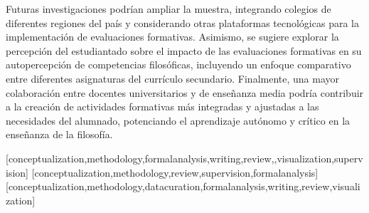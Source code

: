 \documentclass[spanish]{textolivre}
\begin{document}
Futuras investigaciones podrían ampliar la muestra, integrando colegios de diferentes regiones del país y considerando otras plataformas tecnológicas para la implementación de evaluaciones formativas. Asimismo, se sugiere explorar la percepción del estudiantado sobre el impacto de las evaluaciones formativas en su autopercepción de competencias filosóficas, incluyendo un enfoque comparativo entre diferentes asignaturas del currículo secundario. Finalmente, una mayor colaboración entre docentes universitarios y de enseñanza media podría contribuir a la creación de actividades formativas más integradas y ajustadas a las necesidades del alumnado, potenciando el aprendizaje autónomo y crítico en la enseñanza de la filosofía.


\printbibliography\label{sec-bib}


\begin{contributors}
[conceptualization,methodology,formalanalysis,writing,review,,visualization,supervision]
[conceptualization,methodology,review,supervision,formalanalysis]
[conceptualization,methodology,datacuration,formalanalysis,writing,review,visualization]
\end{contributors}
\end{document}
